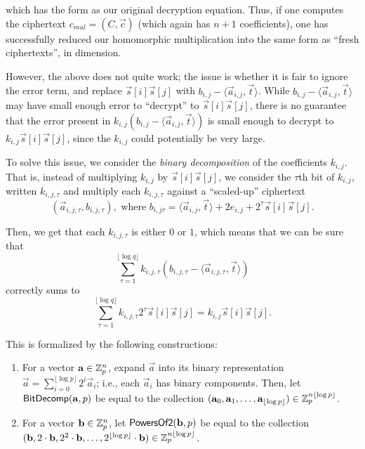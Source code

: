     which has the form as our original decryption equation. Thus, if one computes the ciphertext $c_{mul} = (C, \vec{c})$ (which again has $n+1$ coefficients), one has successfully reduced our homomorphic multiplication into the same form as ``fresh ciphertexts'', in dimension.

    However, the above does not quite work; the issue is whether it is fair to ignore the error term, and replace  $\vec{s}[i]\vec{s}[j]$ with $b_{i,j} - \langle \vec{a}_{i,j} , \vec{t} \rangle$. While $b_{i,j} - \langle \vec{a}_{i,j} , \vec{t} \rangle$ may have small enough error to ``decrypt'' to $\vec{s}[i]\vec{s}[j]$, there is no guarantee that the error present in $k_{i,j} (b_{i,j} - \langle \vec{a}_{i,j} , \vec{t} \rangle)$ is small enough to decrypt to $k_{i,j} \vec{s}[i] \vec{s}[j]$, since the $k_{i,j}$ could potentially be very large.

    To solve this issue, we consider the \emph{binary decomposition} of the coefficients $k_{i,j}$. That is, instead of multiplying $k_{i,j}$ by $\vec{s}[i]\vec{s}[j]$, we consider the $\tau$th bit of $k_{i,j}$, written $k_{i,j,\tau}$ and multiply each $k_{i,j,\tau}$ against a ``scaled-up'' ciphertext
    \[(\vec{a}_{i,j, \tau}, b_{i,j, \tau}), \text{ where } b_{i,j\tau } = \langle \vec{a}_{i,j}, \vec{t} \rangle + 2 e_{i,j} + 2^\tau \vec{s}[i]\vec{s}[j].\]

    Then,  we get that each $k_{i,j,\tau}$ is either $0$ or $1$, which means that we can be sure that
    \[\sum_{\tau = 1}^{\lfloor \log q \rfloor} k_{i,j,\tau} (b_{i,j, \tau} - \langle \vec{a}_{i,j, \tau} , \vec{t} \rangle)\]
    correctly sums to
    \[\sum_{\tau = 1}^{\lfloor \log q \rfloor} k_{i,j,\tau} 2^\tau \vec{s}[i]\vec{s}[j] = k_{i,j} \vec{s}[i] \vec{s}[j].\]

    This is formalized by the following constructions:
    \begin{definition} \label{def:bdpw2}

        \begin{enumerate}
        \item For a vector $\vec{a} \in \Z_p^n$, expand $\vec{a}$ into its binary representation $\vec{a} = \sum_{i = 0}^{\lfloor \log p \rfloor} 2^i \vec{a}_i$; i.e., each $\vec{a}_i$ has binary components.
        Then, let ${\sf BitDecomp}(\vec{a}, p)$ be equal to the collection $(\vec{a}_0, \vec{a}_1, \dots, \vec{a}_{\lfloor \log p \rfloor}) \in \Z_p^{n \lfloor \log p \rfloor}$.

        \item For a vector $\vec{b} \in \Z_p^n$, let ${\sf PowersOf2}(\vec{b}, p)$ be equal to the collection $(\vec{b}, 2 \cdot \vec{b}, 2^2 \cdot \vec{b}, \dots, 2^{\lfloor \log p \rfloor} \cdot \vec{b}) \in \Z_p^{n \lfloor \log p \rfloor}$.
        \end{enumerate}
    \end{definition}



